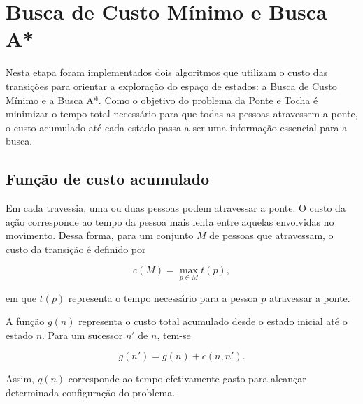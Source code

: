 \documentclass[12pt,a4paper]{article}
\begin{document}



\section{Busca de Custo Mínimo e Busca A*}

Nesta etapa foram implementados dois algoritmos que utilizam o custo das
transições para orientar a exploração do espaço de estados: a Busca de Custo
Mínimo e a Busca A*. Como o objetivo do problema da Ponte e Tocha é minimizar
o tempo total necessário para que todas as pessoas atravessem a ponte, o custo
acumulado até cada estado passa a ser uma informação essencial para a busca.


\subsection{Função de custo acumulado}

Em cada travessia, uma ou duas pessoas podem atravessar a ponte. O custo da
ação corresponde ao tempo da pessoa mais lenta entre aquelas envolvidas no
movimento. Dessa forma, para um conjunto $M$ de pessoas que atravessam, o
custo da transição é definido por

\[
c(M)=\max_{p\in M} t(p),
\]

em que $t(p)$ representa o tempo necessário para a pessoa $p$ atravessar a
ponte.

A função $g(n)$ representa o custo total acumulado desde o estado inicial até
o estado $n$. Para um sucessor $n'$ de $n$, tem-se

\[
g(n') = g(n) + c(n,n').
\]

Assim, $g(n)$ corresponde ao tempo efetivamente gasto para alcançar determinada
configuração do problema.
\end{document}
